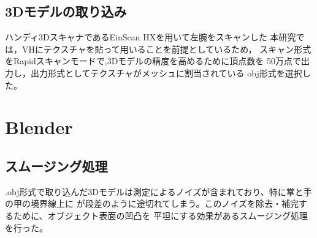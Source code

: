 \documentclass{ltjsreport}
\begin{document}
		\subsection{3Dモデルの取り込み}
			ハンディ3DスキャナであるEinScan HXを用いて左腕をスキャンした
			本研究では，VHにテクスチャを貼って用いることを前提としているため，
			スキャン形式をRapidスキャンモードで,3Dモデルの精度を高めるために頂点数を
			50万点で出力し，出力形式としてテクスチャがメッシュに割当されている
			obj形式を選択した。
	\section{Blender}
		\subsection{スムージング処理}
			.obj形式で取り込んだ3Dモデルは測定によるノイズが含まれており、特に掌と手の甲の境界線上に
			が段差のように途切れてしまう。このノイズを除去・補完するために、オブジェクト表面の凹凸を
			平坦にする効果があるスムージング処理を行った。
\end{document}
